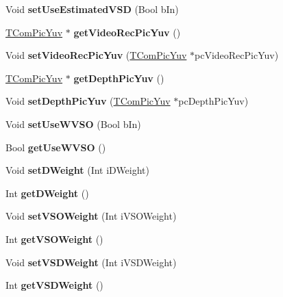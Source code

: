 \begin{DoxyCompactItemize}
\mbox{\label{class_t_com_rd_cost_a855b1432afefa68705d82d88c1f3bdd3}} 
Void {\bfseries set\+Use\+Estimated\+V\+SD} (Bool b\+In)
\item 
\mbox{\label{class_t_com_rd_cost_a70a95008c0d199b55db0edac445a5094}} 
\hyperlink{class_t_com_pic_yuv}{T\+Com\+Pic\+Yuv} $\ast$ {\bfseries get\+Video\+Rec\+Pic\+Yuv} ()
\item 
\mbox{\label{class_t_com_rd_cost_ab7b35e344c4e217671378a4bbf369240}} 
Void {\bfseries set\+Video\+Rec\+Pic\+Yuv} (\hyperlink{class_t_com_pic_yuv}{T\+Com\+Pic\+Yuv} $\ast$pc\+Video\+Rec\+Pic\+Yuv)
\item 
\mbox{\label{class_t_com_rd_cost_afa1344eae2fc54b763d563f39fa0e1a2}} 
\hyperlink{class_t_com_pic_yuv}{T\+Com\+Pic\+Yuv} $\ast$ {\bfseries get\+Depth\+Pic\+Yuv} ()
\item 
\mbox{\label{class_t_com_rd_cost_a77b1874d9ba580d08bade715f7f1966d}} 
Void {\bfseries set\+Depth\+Pic\+Yuv} (\hyperlink{class_t_com_pic_yuv}{T\+Com\+Pic\+Yuv} $\ast$pc\+Depth\+Pic\+Yuv)
\item 
\mbox{\label{class_t_com_rd_cost_a89abf6cdea6fb4cde17f87a71494a8fa}} 
Void {\bfseries set\+Use\+W\+V\+SO} (Bool b\+In)
\item 
\mbox{\label{class_t_com_rd_cost_a2580d3cedfa38702bff50af3f4c442c0}} 
Bool {\bfseries get\+Use\+W\+V\+SO} ()
\item 
\mbox{\label{class_t_com_rd_cost_a11194b4df9f6d344adaa334a57cc12c1}} 
Void {\bfseries set\+D\+Weight} (Int i\+D\+Weight)
\item 
\mbox{\label{class_t_com_rd_cost_a377bc972e749debdacd62e3c3555e71a}} 
Int {\bfseries get\+D\+Weight} ()
\item 
\mbox{\label{class_t_com_rd_cost_a50fed49f341e2250836266d52ab19c8d}} 
Void {\bfseries set\+V\+S\+O\+Weight} (Int i\+V\+S\+O\+Weight)
\item 
\mbox{\label{class_t_com_rd_cost_ae2258dd6f5c5f009088074e2d083cf31}} 
Int {\bfseries get\+V\+S\+O\+Weight} ()
\item 
\mbox{\label{class_t_com_rd_cost_a5021614841fa1c2561c272eb6df12975}} 
Void {\bfseries set\+V\+S\+D\+Weight} (Int i\+V\+S\+D\+Weight)
\item 
\mbox{\label{class_t_com_rd_cost_a1845c63ed8950d250d88f5eac1db7d53}} 
Int {\bfseries get\+V\+S\+D\+Weight} ()
\end{DoxyCompactItemize}
